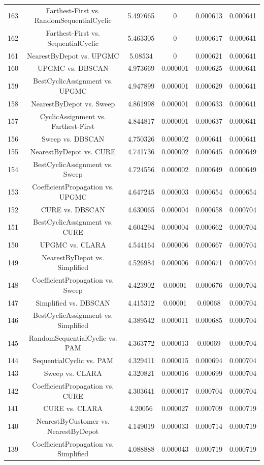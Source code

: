 \documentclass[a4paper,10pt]{article}
\begin{document}
\begin{landscape}
\begin{table}[!htp]
\begin{tabular}{cccccc}
163&Farthest-First vs. RandomSequentialCyclic&5.497665&0&0.000613&0.000641\\
162&Farthest-First vs. SequentialCyclic&5.463305&0&0.000617&0.000641\\
161&NearestByDepot vs. UPGMC&5.08534&0&0.000621&0.000641\\
160&UPGMC vs. DBSCAN&4.973669&0.000001&0.000625&0.000641\\
159&BestCyclicAssignment vs. UPGMC&4.947899&0.000001&0.000629&0.000641\\
158&NearestByDepot vs. Sweep&4.861998&0.000001&0.000633&0.000641\\
157&CyclicAssignment vs. Farthest-First&4.844817&0.000001&0.000637&0.000641\\
156&Sweep vs. DBSCAN&4.750326&0.000002&0.000641&0.000641\\
155&NearestByDepot vs. CURE&4.741736&0.000002&0.000645&0.000649\\
154&BestCyclicAssignment vs. Sweep&4.724556&0.000002&0.000649&0.000649\\
153&CoefficientPropagation vs. UPGMC&4.647245&0.000003&0.000654&0.000654\\
152&CURE vs. DBSCAN&4.630065&0.000004&0.000658&0.000704\\
151&BestCyclicAssignment vs. CURE&4.604294&0.000004&0.000662&0.000704\\
150&UPGMC vs. CLARA&4.544164&0.000006&0.000667&0.000704\\
149&NearestByDepot vs. Simplified&4.526984&0.000006&0.000671&0.000704\\
148&CoefficientPropagation vs. Sweep&4.423902&0.00001&0.000676&0.000704\\
147&Simplified vs. DBSCAN&4.415312&0.00001&0.00068&0.000704\\
146&BestCyclicAssignment vs. Simplified&4.389542&0.000011&0.000685&0.000704\\
145&RandomSequentialCyclic vs. PAM&4.363772&0.000013&0.00069&0.000704\\
144&SequentialCyclic vs. PAM&4.329411&0.000015&0.000694&0.000704\\
143&Sweep vs. CLARA&4.320821&0.000016&0.000699&0.000704\\
142&CoefficientPropagation vs. CURE&4.303641&0.000017&0.000704&0.000704\\
141&CURE vs. CLARA&4.20056&0.000027&0.000709&0.000719\\
140&NearestByCustomer vs. NearestByDepot&4.149019&0.000033&0.000714&0.000719\\
139&CoefficientPropagation vs. Simplified&4.088888&0.000043&0.000719&0.000719\\

\end{tabular}
\end{table}
\end{landscape}
\end{document}
